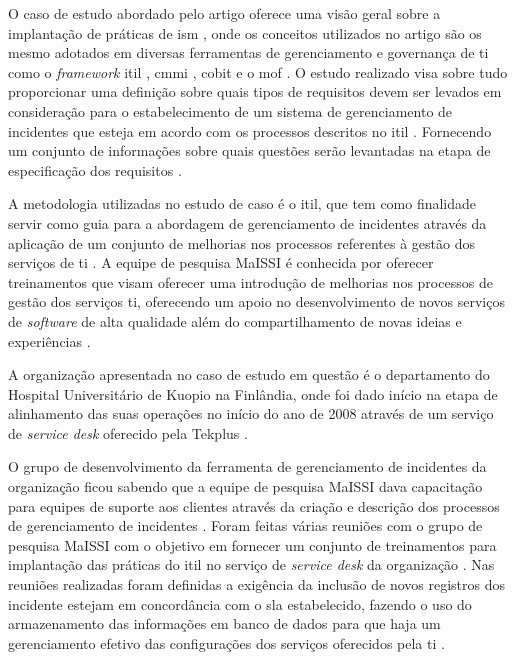 O caso de estudo abordado pelo artigo oferece uma visão geral sobre a implantação de práticas de \acrshort{ism} \cite{jantti2009defining}, onde os conceitos utilizados no artigo são os mesmo adotados em diversas ferramentas de gerenciamento e governança de \acrshort{ti} como o \textit{framework} \acrshort{itil} \cite{introductoryoverviewofitil}, \acrshort{cmmi} \cite{Chrissis:2003:CGP:773274}, \acrshort{cobit} \cite{bernard2012cobit} e o \gls{mof} \cite{pultorak2008mof}. O estudo realizado visa sobre tudo proporcionar uma definição sobre quais tipos de requisitos devem ser levados em consideração para o estabelecimento de um sistema de gerenciamento de incidentes que esteja em acordo com os processos descritos no \acrshort{itil} \cite{introductoryoverviewofitil}. Fornecendo um conjunto de informações sobre quais questões serão levantadas na etapa de especificação dos requisitos \cite{jantti2009defining}.

A metodologia utilizadas no estudo de caso é o \acrshort{itil}, que tem como finalidade servir como guia para a abordagem de gerenciamento de incidentes através da aplicação de um conjunto de melhorias nos processos referentes à gestão dos serviços de \acrshort{ti} \cite{jantti2009defining}. A equipe de pesquisa MaISSI \cite{mailsi} é conhecida por oferecer treinamentos que visam oferecer uma introdução de melhorias nos processos de gestão dos serviços \acrshort{ti}, oferecendo um apoio no desenvolvimento de novos serviços de \textit{software} de alta qualidade além do compartilhamento de novas ideias e experiências \cite{jantti2009defining}.

A organização apresentada no caso de estudo em questão é o departamento do Hospital Universitário de Kuopio na Finlândia, onde foi dado início na etapa de alinhamento das suas operações no início do ano de 2008 através de um serviço de \textit{service desk} oferecido pela Tekplus \cite{jantti2009defining}.

O grupo de desenvolvimento da ferramenta de gerenciamento de incidentes da organização ficou sabendo que a equipe de pesquisa MaISSI dava capacitação para equipes de suporte aos clientes através da criação e descrição dos processos de gerenciamento de incidentes \cite{jantti2009defining}. Foram feitas várias reuniões com o grupo de pesquisa MaISSI com o objetivo em fornecer um conjunto de treinamentos para implantação das práticas do \acrshort{itil} no serviço de \textit{service desk} da organização \cite{jantti2009defining}. Nas reuniões realizadas foram definidas a exigência da inclusão de novos registros dos incidente estejam em concordância com o \gls{sla} estabelecido, fazendo o uso do armazenamento das informações em banco de dados para que haja um gerenciamento efetivo das configurações dos serviços oferecidos pela \acrshort{ti} \cite{jantti2009defining}.

